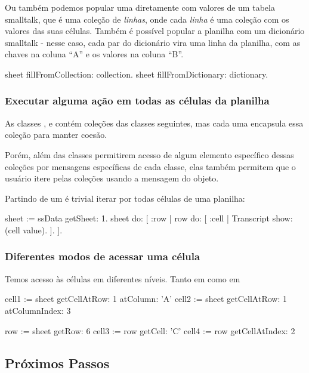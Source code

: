 {Ou também podemos popular uma  diretamente com valores de um tabela
smalltalk, que é uma coleção de \textit{linhas}, onde cada \textit{linha} é uma coleção
com os valores das suas células. Também é possível popular a planilha com um dicionário
smalltalk - nesse caso, cada par  do dicionário vira uma linha
da planilha, com as chaves na coluna ``A'' e os valores na coluna ``B''.
\begin{godSS}[moreemph={fillFromCollection:,fillFromDictionary:}]
sheet fillFromCollection: collection.
sheet fillFromDictionary: dictionary.
\end{godSS}

\subsubsection{Executar alguma ação em todas as células da planilha}
As classes ,  e  contém
coleções das classes seguintes, mas cada uma encapsula essa coleção para manter coesão.

Porém, além das classes permitirem acesso de algum elemento específico dessas coleções
por mensagens específicas de cada classe, elas também permitem que o usuário
itere pelas coleções usando a mensagem  do objeto.

Partindo de um  é trivial iterar por todas células de uma planilha:
\begin{godSS}[moreemph={getSheet:,do:,show:}]
sheet := ssData getSheet: 1.
sheet do: [ :row |
  row do: [ :cell |
    Transcript show: (cell value).
    ].
  ].
\end{godSS}


\subsubsection{Diferentes modos de acessar uma célula}
Temos acesso às células em diferentes níveis. Tanto em  como em 

\begin{godSS}[moreemph={getCellAtRow:, atColumn:, atColumnIndex:, getCell:, getCellAtIndex:, getRow:}]
cell1 := sheet getCellAtRow: 1 atColumn: 'A'
cell2 := sheet getCellAtRow: 1 atColumnIndex: 3

row := sheet getRow: 6
cell3 := row getCell: 'C'
cell4 := row getCellAtIndex: 2
\end{godSS}

\subsection{Próximos Passos}

}
